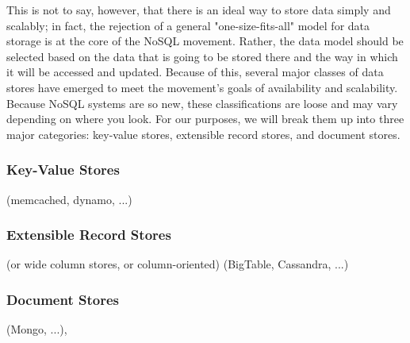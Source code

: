 \documentclass[11pt,a4paper]{report}
\begin{document}
This is not to say, however, that there is an ideal way to store data simply and scalably; in fact, the rejection of a general "one-size-fits-all" model for data storage is at the core of the NoSQL movement. Rather, the data model should be selected based on the data that is going to be stored there and the way in which it will be accessed and updated. Because of this, several major classes of data stores have emerged to meet the movement's goals of availability and scalability. Because NoSQL systems are so new, these classifications are loose and may vary depending on where you look. For our purposes, we will break them up into three major categories: key-value stores, extensible record stores, and document stores.

\subsubsection{Key-Value Stores}
 (memcached, dynamo, ...)
\subsubsection{Extensible Record Stores}
 (or wide column stores, or column-oriented) (BigTable, Cassandra, ...)
\subsubsection{Document Stores}
(Mongo, ...),
\end{document}
